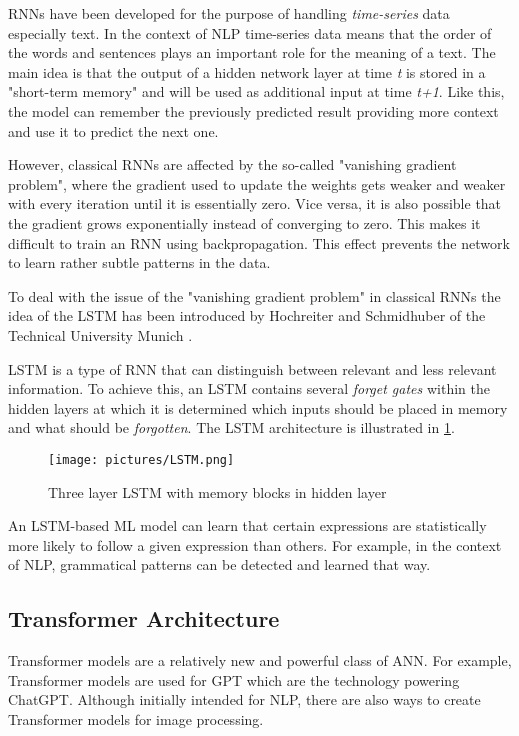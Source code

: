 \acp{RNN} have been developed for the purpose of handling \textit{time-series} data especially text. In the context of \ac{NLP} time-series data means that the order of the words and sentences plays an important role for the meaning of a text. 
The main idea is that the output of a hidden network layer at time \textit{t} is stored in a "short-term memory" and will be used as additional input at time \textit{t+1}. Like this, the model can remember the previously predicted result providing more context and use it to predict the next one. \cite{hochreiter1997long,gers2000learning}

However, classical \acp{RNN} are affected by the so-called "vanishing gradient problem", where the gradient used to update the weights gets weaker and weaker with every iteration until it is essentially zero. Vice versa, it is also possible that the gradient grows exponentially instead of converging to zero. This makes it difficult to train an \ac{RNN} using backpropagation. This effect prevents the network to learn rather subtle patterns in the data. \cite{hochreiter2001gradient}

To deal with the issue of the "vanishing gradient problem" in classical \acp{RNN} the idea of the \acf{LSTM} has been introduced by Hochreiter and Schmidhuber of the Technical University Munich \cite{hochreiter1997long}. 

\ac{LSTM} is a type of \ac{RNN} that can distinguish between relevant and less relevant information. To achieve this, an \ac{LSTM} contains several \textit{forget gates} within the hidden layers at which it is determined which inputs should be placed in memory and what should be \textit{forgotten}. The \ac{LSTM} architecture is illustrated in \cref{pic:LSTM}.

\begin{figure}[ht]
    \centering 
    \texttt{[image: pictures/LSTM.png]}
    \caption{Three layer LSTM with memory blocks in hidden layer \cite{gers2000learning}}
    \label{pic:LSTM}    %
\end{figure}

An LSTM-based ML model can learn that certain expressions are statistically more likely to follow a given expression than others. For example, in the context of \ac{NLP}, grammatical patterns can be detected and learned that way.
\cite{hochreiter1997long,hochreiter2001gradient}

\subsection{Transformer Architecture}
\label{Transformer}
Transformer models are a relatively new and powerful class of \ac{ANN}. 
For example, Transformer models are used for \acf{GPT} which are the technology powering ChatGPT. Although initially intended for \ac{NLP}, there are also ways to create Transformer models for image processing.
\cite{brown2020language}

